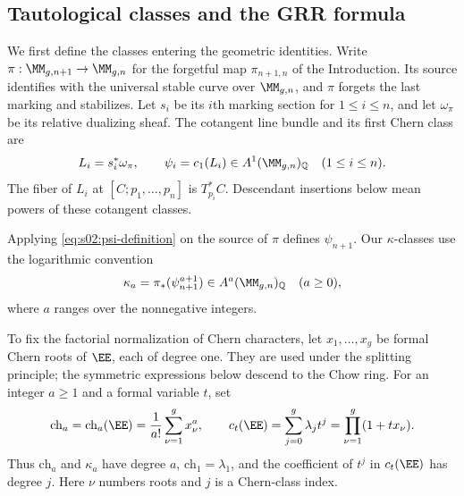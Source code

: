 \subsection{Tautological classes and the GRR formula}
\label{subsec:s02:02}

We first define the classes entering the geometric identities.  Write
$\pi:\MM_{g,n+1}\to\MM_{g,n}$ for the forgetful map
$\pi_{n+1,n}$ of the Introduction.  Its source identifies with the
universal stable curve over $\MM_{g,n}$, and $\pi$ forgets the last
marking and stabilizes.  Let $s_i$ be its $i$th marking section for
$1\leq i\leq n$, and let $\omega_\pi$ be its relative dualizing
sheaf.  The cotangent line
bundle and its first Chern class are
\begin{equation}
\label{eq:s02:psi-definition}
L_i=s_i^*\omega_\pi,
\qquad
\psi_i=c_1(L_i)\in A^1(\MM_{g,n})_{\mathbb Q}
\quad(1\leq i\leq n).
\end{equation}
The fiber of $L_i$ at $[C;p_1,\ldots,p_n]$ is $T_{p_i}^*C$.
Descendant insertions below mean powers of these cotangent classes.

Applying \eqref{eq:s02:psi-definition} on the source of $\pi$ defines
$\psi_{n+1}$.  Our $\kappa$-classes use the logarithmic
convention
\begin{equation}
\label{eq:s02:kappa-definition}
\kappa_a=\pi_*(\psi_{n+1}^{a+1})
\in A^a(\MM_{g,n})_{\mathbb Q}
\quad(a\geq0),
\end{equation}
where $a$ ranges over the nonnegative integers.

To fix the factorial normalization of Chern characters, let
$x_1,\ldots,x_g$ be formal Chern roots of $\EE$, each of degree one.
They are used under the splitting principle; the symmetric expressions
below descend to the Chow ring.  For an integer $a\geq1$ and a formal
variable $t$, set
\begin{equation}
\label{eq:s02:chern-definitions}
\mathrm{ch}_a=\mathrm{ch}_a(\EE)
=\frac{1}{a!}\sum_{\nu=1}^g x_\nu^a,
\qquad
c_t(\EE)=\sum_{j=0}^g\lambda_jt^j
=\prod_{\nu=1}^g(1+tx_\nu).
\end{equation}
Thus $\mathrm{ch}_a$ and $\kappa_a$ have degree $a$,
$\mathrm{ch}_1=\lambda_1$, and the coefficient of $t^j$ in
$c_t(\EE)$ has degree $j$.  Here $\nu$ numbers roots and $j$ is a
Chern-class index.

